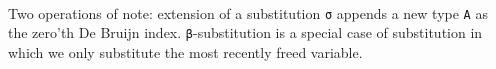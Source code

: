 \documentclass[authoryear, acmsmall, screen, review, nonacm]{acmart} %
\begin{document}
\begin{code}[hide]
\AgdaSymbol{(}\AgdaSpace{}%
\AgdaSpace{}%
\AgdaSpace{}%
\AgdaOperator{\AgdaInductiveConstructor{\textasciitilde{}}}\AgdaSpace{}%
\AgdaSymbol{)}\AgdaSpace{}%
\AgdaSymbol{=}\AgdaSpace{}%
\AgdaSpace{}%
\AgdaSpace{}%
\AgdaSpace{}%
\AgdaSpace{}%
\AgdaSpace{}%
\AgdaSpace{}%
\AgdaSpace{}%
\AgdaOperator{\AgdaInductiveConstructor{\textasciitilde{}}}\AgdaSpace{}%
\AgdaSpace{}%
\AgdaSpace{}%
\<%
\\
\>[0]\AgdaSpace{}%
\AgdaSpace{}%
\AgdaSymbol{(}\AgdaSpace{}%
\AgdaSpace{}%
\AgdaSymbol{)}\AgdaSpace{}%
\AgdaSymbol{=}\AgdaSpace{}%
\AgdaSymbol{(}\AgdaSpace{}%
\AgdaSpace{}%
\AgdaSymbol{)}\AgdaSpace{}%
\AgdaSpace{}%
\AgdaSymbol{(}\AgdaSpace{}%
\AgdaSpace{}%
\AgdaSymbol{)}\<%
\end{code} 

Two operations of note: extension of a substitution \verb!σ! appends a new type \verb!A! as the zero'th De Bruijn index. \verb!β!-substitution is a special case of substitution in which we only substitute the most recently freed variable.
\end{document}
